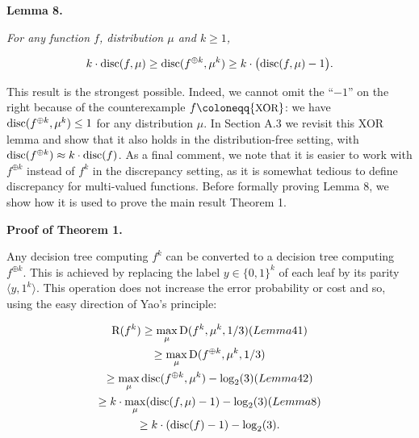 \documentclass[10pt,a4paper]{article}
\begin{document}


\par\medskip\noindent\textbf{
\textbf{Lemma 8}\textbf{.}
}\par



\emph{For any function $f$, distribution $\mu$ and $k\geq 1$,}\par


\[\begin{gathered}
k\cdot{\textup{disc}}(f,\mu)\geq{\textup{disc}}(f^{\oplus k},\mu^{k})\geq k\cdot\big{(}{\textup{disc}}(f,\mu)-1\big{)}.
\end{gathered}\]






This result is the strongest possible. Indeed, we cannot omit the “$-1$” on the right because of the counterexample $f\coloneqq{\textrm{\small{XOR}}}$: we have ${\textup{disc}}(f^{\oplus k},\mu^{k})\leq 1$ for any distribution $\mu$. In Section A.3 we revisit this XOR lemma and show that it also holds in the distribution-free setting, with ${\textup{disc}}(f^{\oplus k})\approx k\cdot{\textup{disc}}(f)$. As a final comment, we note that it is easier to work with $f^{\oplus k}$ instead of $f^{k}$ in the discrepancy setting, as it is somewhat tedious to define discrepancy for multi-valued functions. Before formally proving Lemma 8, we show how it is used to prove the main result Theorem 1.\par




\par\medskip\noindent\textbf{Proof of Theorem 1.}\par




Any decision tree computing $f^{k}$ can be converted to a decision tree computing $f^{\oplus k}$. This is achieved by replacing the label $y\in\{0,1\}^{k}$ of each leaf by its parity $\langle y,1^{k}\rangle$. This operation does not increase the error probability or cost and so, using the easy direction of Yao’s principle:\par


\[\begin{gathered}
\displaystyle{\textup{R}}(f^{k}) \displaystyle\geq\max_{\mu}{\textup{D}}(f^{k},\mu^{k},1/3) (Lemma 41) \\
\displaystyle\geq\max_{\mu}{\textup{D}}(f^{\oplus k},\mu^{k},1/3) \\
\displaystyle\geq\max_{\mu}{\textup{disc}}(f^{\oplus k},\mu^{k})-\log_{2}(3) (Lemma 42) \\
\displaystyle\geq k\cdot\max_{\mu}({\textup{disc}}(f,\mu)-1)-\log_{2}(3) (Lemma 8) \\
\displaystyle\geq k\cdot({\textup{disc}}(f)-1)-\log_{2}(3).
\end{gathered}\]
\end{document}
